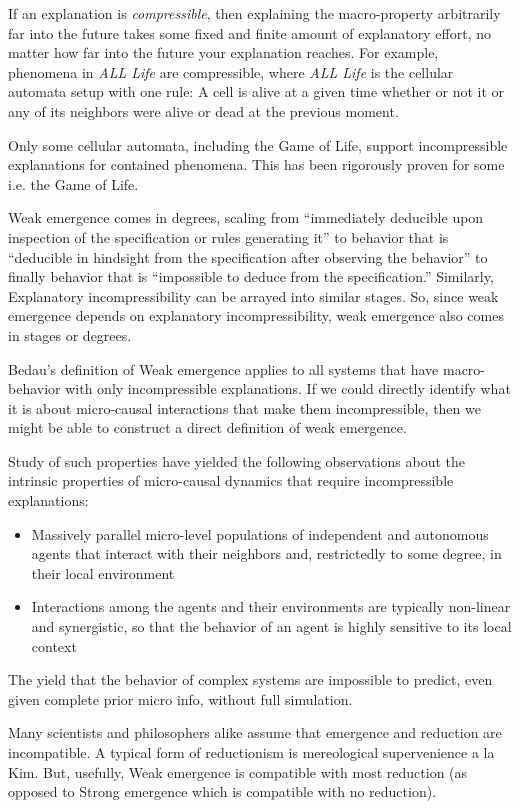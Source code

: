 \documentclass{article}
\newcommand{\ti}[1]{\textit{#1}}
\begin{document}
If an explanation is \ti{compressible}, then explaining the macro-property arbitrarily far into the future takes some fixed and finite amount of explanatory effort, no matter how far into the future your explanation reaches. For example, phenomena in \ti{ALL Life} are compressible, where \ti{ALL Life} is the cellular automata setup with one rule: A cell is alive at a given time whether or not it or any of its neighbors were alive or dead at the previous moment.

Only some cellular automata, including the Game of Life, support incompressible explanations for contained phenomena. This has been rigorously proven for some i.e. the Game of Life.

Weak emergence comes in degrees, scaling from ``immediately deducible upon inspection of the specification or rules generating it'' to behavior that is ``deducible in hindsight from the specification after observing the behavior'' to finally behavior that is ``impossible to deduce from the specification.'' Similarly, Explanatory incompressibility can be arrayed into similar stages. So, since weak emergence depends on explanatory incompressibility, weak emergence also comes in stages or degrees.

Bedau's definition of Weak emergence applies to all systems that have macro-behavior with only incompressible explanations. If we could directly identify what it is about micro-causal interactions that make them incompressible, then we might be able to construct a direct definition of weak emergence.

Study of such properties have yielded the following observations about the intrinsic properties of micro-causal dynamics that require incompressible explanations:

\begin{itemize}
    \item Massively parallel micro-level populations of independent and autonomous agents that interact with their neighbors and, restrictedly to some degree, in their local environment
    \item Interactions among the agents and their environments are typically non-linear and synergistic, so that the behavior of an agent is highly sensitive to its local context
\end{itemize}

The yield that the behavior of complex systems are impossible to predict, even given complete prior micro info, without full simulation.

Many scientists and philosophers alike assume that emergence and reduction are incompatible. A typical form of reductionism is mereological supervenience a la Kim. But, usefully, Weak emergence is compatible with most reduction (as opposed to Strong emergence which is compatible with no reduction).
\end{document}
